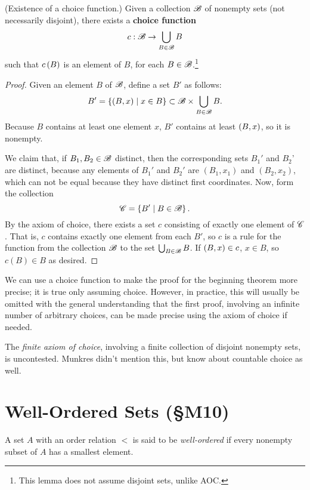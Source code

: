 \documentclass{report}
\begin{document}
\begin{lemma}
  {\normalfont (Existence of a choice function.)}
  Given a collection $\mathscr{B}$ of nonempty sets (not necessarily disjoint), there exists a \textbf{choice function}
  \[
    c: \mathscr{B} \rightarrow \bigcup_{B \in \mathscr{B}} B
  \]
  such that $c \left( B \right)$ is an element of $B$, for each $B \in \mathscr{B}$.\footnote{This lemma does not assume disjoint sets, unlike AOC.}
\end{lemma}
\begin{proof}
  Given an element $B$ of $\mathscr{B}$, define a set $B'$ as follows:
  \[
    B' = \left\{  \left( B,x \right) \mid x \in B \right\} \subset \mathscr{B} \times \bigcup_{B \in \mathscr{B}} B.
  \]
  Because $B$ contains at least one element $x$, $B'$ contains at least $\left( B,x \right)$, so it is nonempty.

  We claim that, if $B_1,B_2 \in \mathscr{B}$ distinct, then the corresponding sets $B_1'$ and $B_2$' are distinct, because any elements of $B_1'$ and $B_2'$ are $(B_1,x_1)$ and $(B_2,x_2)$, which can not be equal because they have distinct first coordinates. 
  Now, form the collection
  \[
    \mathscr{C} = \left\{ B' \mid B \in \mathscr{B} \right\}.
  \]
  By the axiom of choice, there exists a set $c$ consisting of exactly one element of $\mathscr{C}$.
  That is, $c$ contains exactly one element from each $B'$, so $c$ is a rule for the function from the collection $\mathscr{B}$ to the set $\bigcup_{B \in \mathscr{B}} B$.
  If $\left( B,x \right) \in c$, $x \in B$, so $c(B) \in B$ as desired.
\end{proof}

We can use a choice function to make the proof for the beginning theorem more precise; it is true only assuming choice.
However, in practice, this will usually be omitted with the general understanding that the first proof, involving an infinite number of arbitrary choices, can be made precise using the axiom of choice if needed.

The \emph{finite axiom of choice}, involving a finite collection of disjoint nonempty sets, is uncontested.
Munkres  didn't mention this, but know about countable choice as well.

\section{Well-Ordered Sets (\S M10)}
\begin{definition}
  A set $A$ with an order relation $<$ is said to be \emph{well-ordered} if every nonempty subset of $A$ has a smallest element.
\end{definition}
\end{document}
